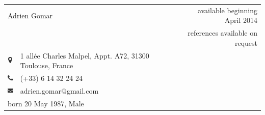 \documentclass[10pt]{article}
\begin{document}
\begin{tabular}[ht]{clr}
	\multicolumn{2}{l}{\LARGE Adrien Gomar} & {\large available beginning April 2014} \\
	& & \phantom{aaaaaaaaaaaaaaaaaaaa} {references available on request} \\
	\includegraphics[height=9pt]{pictures/icon-map.pdf} & 1 allée Charles Malpel, Appt. A72, 31300 Toulouse, France \\
	\includegraphics[height=9pt]{pictures/icon-phone.pdf} & (+33) 6 14 32 24 24 \\
	\includegraphics[height=9pt]{pictures/icon-mail.pdf} & adrien.gomar@gmail.com \\
	\multicolumn{2}{l}{born 20 May 1987, Male} & \\
\end{tabular}

\begin{mytable}
\end{mytable}
\end{document}
